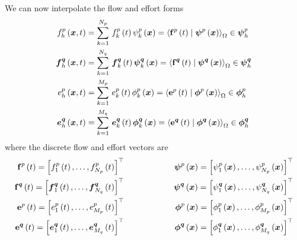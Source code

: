 We can now interpolate the flow and effort forms \ie
\begin{align}
  \fnof{f^{p}_{h}}{\vectr{x},t}&=\gsum{k=1}{N_{p}}{\fnof{f^{p}_{k}}{t}\fnof{\psi^{p}_{k}}{\vectr{x}}}=\dualityform{\fnof{\dcovectr{f}^{p}}{t}}{\fnof{\covectr{\psi}^{p}}{\vectr{x}}}{\Omega}\in\covectr{\psi}^{p}_{h}\\
  \fnof{\covectr{f}^{\covectr{q}}_{h}}{\vectr{x},t}&=\gsum{k=1}{N_{q}}{\fnof{\covectr{f}^{\covectr{q}}_{k}}{t}\fnof{\covectr{\psi}^{\covectr{q}}_{k}}{\vectr{x}}}=\dualityform{\fnof{\dcovectr{f}^{\covectr{q}}}{t}}{\fnof{\covectr{\psi}^{\covectr{q}}}{\vectr{x}}}{\Omega}\in\covectr{\psi}^{\covectr{q}}_{h}\\
  \fnof{e^{p}_{h}}{\vectr{x},t}&=\gsum{k=1}{M_{p}}{\fnof{e^{p}_{k}}{t}\fnof{\phi^{p}_{k}}{\vectr{x}}}=\dualityform{\fnof{\dcovectr{e}^{p}}{t}}{\fnof{\covectr{\phi}^{p}}{\vectr{x}}}{\Omega}\in\covectr{\phi}^{p}_{h}\\
  \fnof{\covectr{e}^{\covectr{q}}_{h}}{\vectr{x},t}&=\gsum{k=1}{M_{q}}{\fnof{\covectr{e}^{\covectr{q}}_{k}}{t}\fnof{\covectr{\phi}^{\covectr{q}}_{k}}{\vectr{x}}}=\dualityform{\fnof{\dcovectr{e}^{\covectr{q}}}{t}}{\fnof{\covectr{\phi}^{\covectr{q}}}{\vectr{x}}}{\Omega}\in\covectr{\phi}^{\covectr{q}}_{h}
\end{align}
where the discrete flow and effort vectors are
\begin{alignat}{3}
    \boldsymbol{\mathrm{f}} ^{p}\left( t \right) = {\left[  f^{p}_{1}\left( t \right) ,\ldots, f^{p}_{N_{p}}\left( t \right)  \right]}^{ \top } &&\qquad\qquad&&  \boldsymbol{\psi} ^{p}\left(  \boldsymbol{x}  \right) = {\left[  \psi^{p}_{1}\left(  \boldsymbol{x}  \right) ,\ldots, \psi^{p}_{N_{p}}\left(  \boldsymbol{x}  \right)  \right]}^{ \top }  \\
    \boldsymbol{\mathrm{f}} ^{ \boldsymbol{q} }\left( t \right) = {\left[   \boldsymbol{f} ^{ \boldsymbol{q} }_{1}\left( t \right) ,\ldots,  \boldsymbol{f} ^{ \boldsymbol{q} }_{N_{q}}\left( t \right)  \right]}^{ \top } &&\qquad\qquad&&  \boldsymbol{\psi} ^{ \boldsymbol{q} }\left(  \boldsymbol{x}  \right) = {\left[  \psi^{ \boldsymbol{q} }_{1}\left(  \boldsymbol{x}  \right) ,\ldots, \psi^{ \boldsymbol{q} }_{N_{q}}\left(  \boldsymbol{x}  \right)  \right]}^{ \top }  \\
    \boldsymbol{\mathrm{e}} ^{p}\left( t \right) = {\left[  e^{p}_{1}\left( t \right) ,\ldots, e^{p}_{M_{p}}\left( t \right)  \right]}^{ \top } &&\qquad\qquad&&  \boldsymbol{\phi} ^{p}\left(  \boldsymbol{x}  \right) = {\left[  \phi^{p}_{1}\left(  \boldsymbol{x}  \right) ,\ldots, \phi^{p}_{M_{p}}\left(  \boldsymbol{x}  \right)  \right]}^{ \top }   \\
    \boldsymbol{\mathrm{e}} ^{ \boldsymbol{q} }\left( t \right) = {\left[   \boldsymbol{e} ^{ \boldsymbol{q} }_{1}\left( t \right) ,\ldots,  \boldsymbol{e} ^{ \boldsymbol{q} }_{M_{q}}\left( t \right)  \right]}^{ \top } &&\qquad\qquad&&  \boldsymbol{\phi} ^{ \boldsymbol{q} }\left(  \boldsymbol{x}  \right) = {\left[  \phi^{ \boldsymbol{q} }_{1}\left(  \boldsymbol{x}  \right) ,\ldots, \phi^{ \boldsymbol{q} }_{M_{q}}\left(  \boldsymbol{x}  \right)  \right]}^{ \top } 
\end{alignat}

